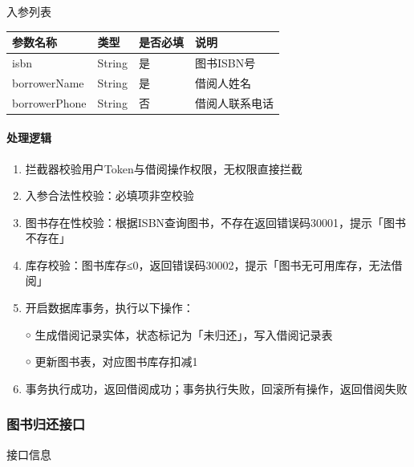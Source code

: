 \documentclass[12pt, a4paper]{article}
\begin{document}
入参列表

\begin{table}[H]
    \centering
    \begin{tabular}{|l|l|l|l|}
        \hline
        参数名称 & 类型 & 是否必填 & 说明 \\
        \hline
        isbn & String & 是 & 图书ISBN号 \\
        \hline
        borrowerName & String & 是 & 借阅人姓名 \\
        \hline
        borrowerPhone & String & 否 & 借阅人联系电话 \\
        \hline
    \end{tabular}
\end{table}

\paragraph{处理逻辑}
\begin{enumerate}
\item 拦截器校验用户Token与借阅操作权限，无权限直接拦截

\item 入参合法性校验：必填项非空校验

\item 图书存在性校验：根据ISBN查询图书，不存在返回错误码30001，提示「图书不存在」

\item 库存校验：图书库存≤0，返回错误码30002，提示「图书无可用库存，无法借阅」

\item 开启数据库事务，执行以下操作：

￮ 生成借阅记录实体，状态标记为「未归还」，写入借阅记录表

￮ 更新图书表，对应图书库存扣减1

\item 事务执行成功，返回借阅成功；事务执行失败，回滚所有操作，返回借阅失败
\end{enumerate}
\newpage
\subsubsection{图书归还接口}

\begin{center}
    接口信息
\end{center}
\end{document}
